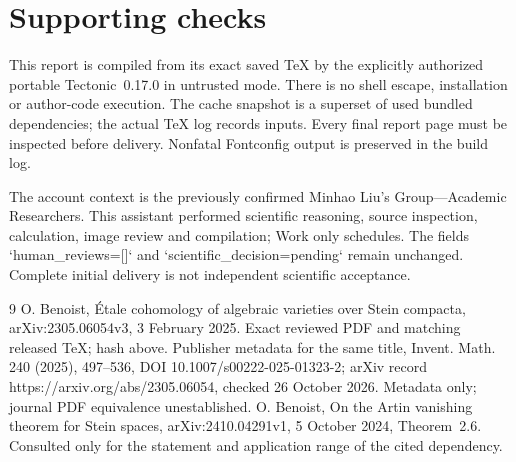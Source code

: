 \documentclass[10pt]{article}
\begin{document}
\section*{Supporting checks}
This report is compiled from its exact saved TeX by the explicitly authorized portable Tectonic 0.17.0 in untrusted mode. There is no shell escape, installation or author-code execution. The cache snapshot is a superset of used bundled dependencies; the actual TeX log records inputs. Every final report page must be inspected before delivery. Nonfatal Fontconfig output is preserved in the build log.\par
The account context is the previously confirmed Minhao Liu’s Group—Academic Researchers. This assistant performed scientific reasoning, source inspection, calculation, image review and compilation; Work only schedules. The fields `human\_reviews=[]` and `scientific\_decision=pending` remain unchanged. Complete initial delivery is not independent scientific acceptance.\par
9 O. Benoist, Étale cohomology of algebraic varieties over Stein compacta, arXiv:2305.06054v3, 3 February 2025. Exact reviewed PDF and matching released TeX; hash above. Publisher metadata for the same title, Invent. Math. 240 (2025), 497–536, DOI 10.1007/s00222-025-01323-2; arXiv record https://arxiv.org/abs/2305.06054, checked 26 October 2026. Metadata only; journal PDF equivalence unestablished. O. Benoist, On the Artin vanishing theorem for Stein spaces, arXiv:2410.04291v1, 5 October 2024, Theorem 2.6. Consulted only for the statement and application range of the cited dependency.\par
\end{document}
